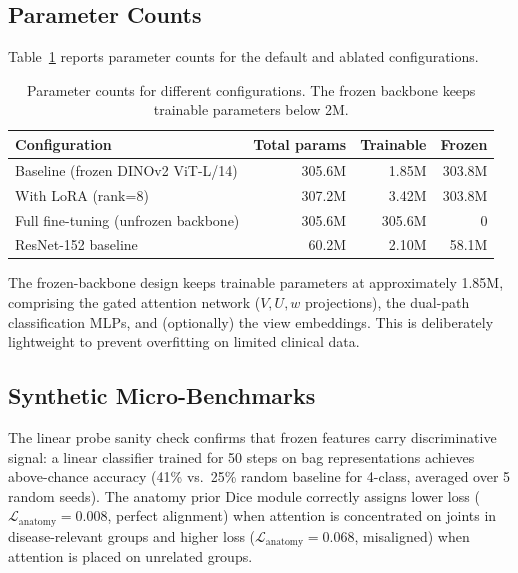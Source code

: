 \documentclass{article}
\begin{document}
\subsection{Parameter Counts}

Table~\ref{tab:params} reports parameter counts for the default and ablated configurations.

\begin{table}[h]
\centering
\caption{Parameter counts for different configurations. The frozen backbone keeps trainable parameters below 2M.}
\label{tab:params}
\begin{tabular}{@{}lrrr@{}}
\toprule
\textbf{Configuration} & \textbf{Total params} & \textbf{Trainable} & \textbf{Frozen} \\
\midrule
Baseline (frozen DINOv2 ViT-L/14) & 305.6M & 1.85M & 303.8M \\
With LoRA (rank=8) & 307.2M & 3.42M & 303.8M \\
Full fine-tuning (unfrozen backbone) & 305.6M & 305.6M & 0 \\
ResNet-152 baseline & 60.2M & 2.10M & 58.1M \\
\bottomrule
\end{tabular}
\end{table}


The frozen-backbone design keeps trainable parameters at approximately 1.85M, comprising the gated attention network ($V, U, w$ projections), the dual-path classification MLPs, and (optionally) the view embeddings. This is deliberately lightweight to prevent overfitting on limited clinical data.

\subsection{Synthetic Micro-Benchmarks}

The linear probe sanity check confirms that frozen features carry discriminative signal: a linear classifier trained for 50 steps on bag representations achieves above-chance accuracy (41\% vs.\ 25\% random baseline for 4-class, averaged over 5 random seeds). The anatomy prior Dice module correctly assigns lower loss ($\mathcal{L}_{\text{anatomy}}=0.008$, perfect alignment) when attention is concentrated on joints in disease-relevant groups and higher loss ($\mathcal{L}_{\text{anatomy}}=0.068$, misaligned) when attention is placed on unrelated groups.
\end{document}
